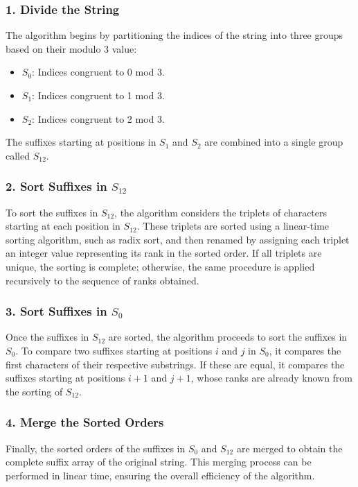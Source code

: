 \subsubsection*{1. Divide the String}

The algorithm begins by partitioning the indices of the string into three groups based on their modulo 3 value:
\begin{itemize}
    \item $S_0$: Indices congruent to 0 mod 3.
    \item $S_1$: Indices congruent to 1 mod 3.
    \item $S_2$: Indices congruent to 2 mod 3.
\end{itemize}

The suffixes starting at positions in $S_1$ and $S_2$ are combined into a single group called $S_{12}$.

\subsubsection*{2. Sort Suffixes in $S_{12}$}

To sort the suffixes in $S_{12}$, the algorithm considers the triplets of characters starting at each position in $S_{12}$. These triplets are sorted using a linear-time sorting algorithm, such as radix sort, and then renamed by assigning each triplet an integer value representing its rank in the sorted order. If all triplets are unique, the sorting is complete; otherwise, the same procedure is applied recursively to the sequence of ranks obtained.

\subsubsection*{3. Sort Suffixes in $S_0$}

Once the suffixes in $S_{12}$ are sorted, the algorithm proceeds to sort the suffixes in $S_0$. To compare two suffixes starting at positions $i$ and $j$ in $S_0$, it compares the first characters of their respective substrings. If these are equal, it compares the suffixes starting at positions $i+1$ and $j+1$, whose ranks are already known from the sorting of $S_{12}$.

\subsubsection*{4. Merge the Sorted Orders}

Finally, the sorted orders of the suffixes in $S_0$ and $S_{12}$ are merged to obtain the complete suffix array of the original string. This merging process can be performed in linear time, ensuring the overall efficiency of the algorithm.

